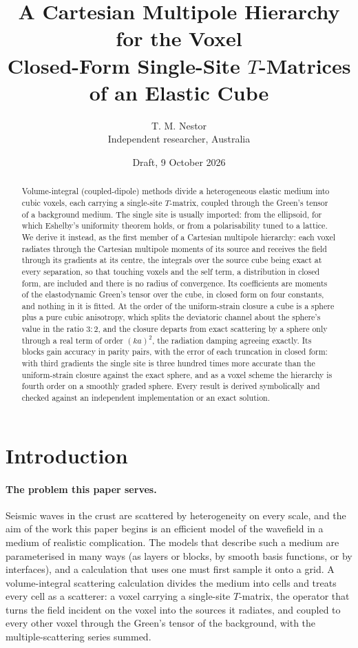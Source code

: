 \documentclass[11pt,a4paper]{article}
\title{\bfseries A Cartesian Multipole Hierarchy for the Voxel\\[4pt]
\large Closed-Form Single-Site $T$-Matrices of an Elastic Cube}
\author{T. M. Nestor\\[2pt]\small Independent researcher, Australia}
\date{Draft, 9 October 2026}
\begin{document}
\maketitle

\begin{abstract}
\noindent
Volume-integral (coupled-dipole) methods divide a heterogeneous elastic medium into cubic voxels, each
carrying a single-site $T$-matrix, coupled through the Green's tensor of a background medium. The single
site is usually imported: from the ellipsoid, for which Eshelby's uniformity theorem holds, or from a
polarisability tuned to a lattice. We derive it instead, as the first member of a Cartesian multipole
hierarchy: each voxel radiates through the Cartesian multipole moments of its source and receives the
field through its gradients at its centre, the integrals over the source cube being exact at every
separation, so that touching voxels and the self term, a distribution in closed form, are included and
there is no radius of convergence. Its coefficients are moments of the elastodynamic Green's tensor over
the cube, in closed form on four constants, and nothing in it is fitted. At the order of the
uniform-strain closure a cube is a sphere plus a pure cubic anisotropy, which splits the deviatoric
channel about the sphere's value in the ratio $3:2$, and the closure departs from exact scattering by a
sphere only through a real term of order $(ka)^2$, the radiation damping agreeing exactly. Its blocks gain
accuracy in parity pairs, with the error of each truncation in closed form: with third gradients the
single site is three hundred times more accurate than the uniform-strain closure against the exact sphere,
and as a voxel scheme the hierarchy is fourth order on a smoothly graded sphere. Every result is derived
symbolically and checked against an independent implementation or an exact solution.
\end{abstract}

\section{Introduction}\label{sec:intro}

\paragraph{The problem this paper serves.} Seismic waves in the crust are scattered by heterogeneity
on every scale, and the aim of the work this paper begins is an efficient model of the wavefield in a
medium of realistic complication. The models that describe such a medium are parameterised in many
ways (as layers or blocks, by smooth basis functions, or by interfaces), and a calculation that uses
one must first sample it onto a grid. A volume-integral scattering calculation divides the medium into
cells and treats every cell as a scatterer: a voxel carrying a single-site $T$-matrix, the operator
that turns the field incident on the voxel into the sources it radiates, and coupled to every other
voxel through the Green's tensor of the background, with the multiple-scattering series summed.
\end{document}
